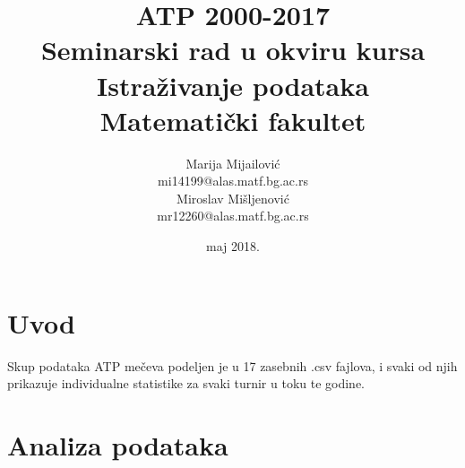 \documentclass[a4paper]{article}
\begin{document}
\title{ATP 2000-2017\\ \small{Seminarski rad u okviru kursa\\Istraživanje podataka\\ Matematički fakultet}}

\author{Marija Mijailović\\ mi14199@alas.matf.bg.ac.rs\\Miroslav Mišljenović\\mr12260@alas.matf.bg.ac.rs}
\date{maj 2018.}
\maketitle


\tableofcontents


\section{Uvod}
\label{sec:uvod}

Skup podataka ATP mečeva podeljen je u 17 zasebnih .csv fajlova, i svaki od njih prikazuje individualne statistike za svaki turnir u toku te godine.


\section{Analiza podataka}
\end{document}
